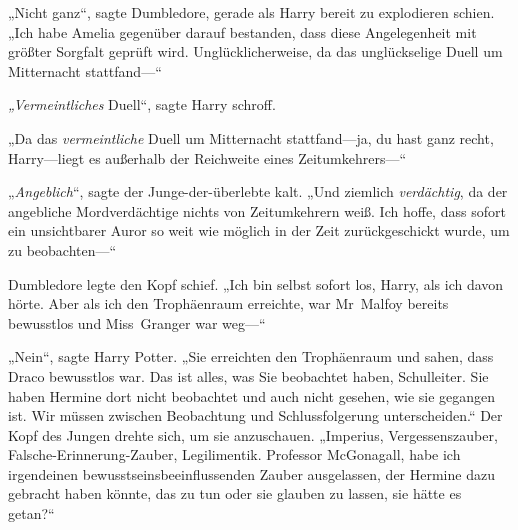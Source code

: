„Nicht ganz“, sagte Dumbledore, gerade als Harry bereit zu explodieren schien. „Ich habe Amelia gegenüber darauf bestanden, dass diese Angelegenheit mit größter Sorgfalt geprüft wird. Unglücklicherweise, da das unglückselige Duell um Mitternacht stattfand—“

\emph{„Vermeintliches} Duell“, sagte Harry schroff.

„Da das \emph{vermeintliche} Duell um Mitternacht stattfand—ja, du hast ganz recht, Harry—liegt es außerhalb der Reichweite eines Zeitumkehrers—“

„\emph{Angeblich}“, sagte der Junge-der-überlebte kalt. „Und ziemlich \emph{verdächtig}, da der angebliche Mordverdächtige nichts von Zeitumkehrern weiß. Ich hoffe, dass sofort ein unsichtbarer Auror so weit wie möglich in der Zeit zurückgeschickt wurde, um zu beobachten—“

Dumbledore legte den Kopf schief. „Ich bin selbst sofort los, Harry, als ich davon hörte. Aber als ich den Trophäenraum erreichte, war Mr~Malfoy bereits bewusstlos und Miss~Granger war weg—“

„Nein“, sagte Harry Potter. „Sie erreichten den Trophäenraum und sahen, dass Draco bewusstlos war. Das ist alles, was Sie beobachtet haben, Schulleiter. Sie haben Hermine dort nicht beobachtet und auch nicht gesehen, wie sie gegangen ist. Wir müssen zwischen Beobachtung und Schlussfolgerung unterscheiden.“
Der Kopf des Jungen drehte sich, um sie anzuschauen.
„Imperius, Vergessenszauber, Falsche-Erinnerung-Zauber, Legilimentik. Professor McGonagall, habe ich irgendeinen bewusstseinsbeeinflussenden Zauber ausgelassen, der Hermine dazu gebracht haben könnte, das zu tun oder sie glauben zu lassen, sie hätte es getan?“

